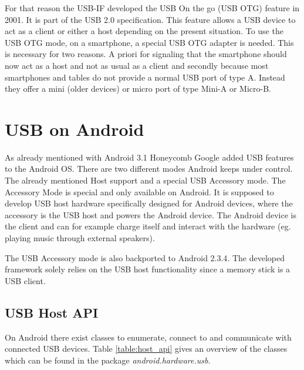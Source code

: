 For that reason the USB-IF developed the USB On the go (USB OTG) feature in 2001. It is part of the USB 2.0 specification\cite{wiki_usb}. This feature allows a USB device to act as a client or either a host depending on the present situation. To use the USB OTG mode, on a smartphone, a special USB OTG adapter is needed. This is necessary for two reasons. A priori for signaling that the smartphone should now act as a host and not as usual as a client and secondly because most smartphones and tables do not provide a normal USB port of type A. Instead they offer a mini (older devices) or micro port of type Mini-A or Micro-B\cite{wiki_usb_otg}. 

\chapter{USB on Android}
\label{chapter:usb_on_android}

As already mentioned with Android 3.1 Honeycomb Google added USB features to the Android OS. There are two different modes Android keeps under control. The already mentioned Host support and a special USB Accessory mode. The Accessory Mode is special and only available on Android. It is supposed to develop USB host hardware specifically designed for Android devices, where the accessory is the USB host and powers the Android device\cite{android_usb_accessory}. The Android device is the client and can for example charge itself and interact with the hardware (eg. playing music through external speakers). 

The USB Accessory mode is also backported to Android 2.3.4\cite{android_usb_accessory}. The developed framework solely relies on the USB host functionality since a memory stick is a USB client.

\section{USB Host API}

On Android there exist classes to enumerate, connect to and communicate with connected USB devices. Table \ref{table:host_api} gives an overview of the classes which can be found in the package \textit{android.hardware.usb}.

